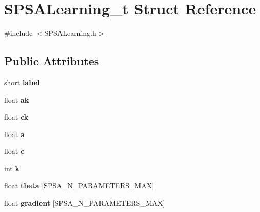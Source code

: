 \hypertarget{structSPSALearning__t}{
\section{SPSALearning\_\-t Struct Reference}
\label{structSPSALearning__t}
}


{\ttfamily \#include $<$SPSALearning.h$>$}

\subsection*{Public Attributes}
\begin{DoxyCompactItemize}
\item 
\hypertarget{structSPSALearning__t_a6d35501a97900b5ad6ea104d394bcc3d}{
short {\bfseries label}}
\label{structSPSALearning__t_a6d35501a97900b5ad6ea104d394bcc3d}

\item 
\hypertarget{structSPSALearning__t_a53dee221203bca2f839c279ef7e8fbcf}{
float {\bfseries ak}}
\label{structSPSALearning__t_a53dee221203bca2f839c279ef7e8fbcf}

\item 
\hypertarget{structSPSALearning__t_aab6a4f69710520c884ba1a44afddf43b}{
float {\bfseries ck}}
\label{structSPSALearning__t_aab6a4f69710520c884ba1a44afddf43b}

\item 
\hypertarget{structSPSALearning__t_a3b5cc6694636acf5abd8120f3b0f4f1c}{
float {\bfseries a}}
\label{structSPSALearning__t_a3b5cc6694636acf5abd8120f3b0f4f1c}

\item 
\hypertarget{structSPSALearning__t_a670b92a362627b2163f812c4596c6351}{
float {\bfseries c}}
\label{structSPSALearning__t_a670b92a362627b2163f812c4596c6351}

\item 
\hypertarget{structSPSALearning__t_ab1d109db9eaad748a140775e7441d776}{
int {\bfseries k}}
\label{structSPSALearning__t_ab1d109db9eaad748a140775e7441d776}

\item 
\hypertarget{structSPSALearning__t_ab99cc08b061c7f2f3b26123a949799b6}{
float {\bfseries theta} \mbox{[}SPSA\_\-N\_\-PARAMETERS\_\-MAX\mbox{]}}
\label{structSPSALearning__t_ab99cc08b061c7f2f3b26123a949799b6}

\item 
\hypertarget{structSPSALearning__t_a76ca8566428cacd5aa4e2ce9dc1500a1}{
float {\bfseries gradient} \mbox{[}SPSA\_\-N\_\-PARAMETERS\_\-MAX\mbox{]}}
\label{structSPSALearning__t_a76ca8566428cacd5aa4e2ce9dc1500a1}


\end{DoxyCompactItemize}
